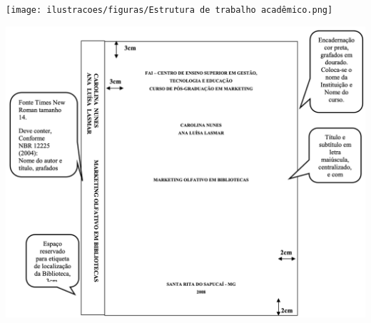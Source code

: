 %
%
%
%


\begin{figura}[h!]
  \centering
  \addfigura
  \texttt{[image: ilustracoes/figuras/Estrutura de trabalho acadêmico.png]}
  \label{figura:EstruturaTrabalhoAcademico}
\end{figura}

\begin{figura}[h!]
  \centering
  \addfigura
  \includegraphics[width=1\textwidth]{ilustracoes/figuras/Modelo de Capa e Lombada.png}
  \label{figura:ModeloDeCapaELombada}
\end{figura}

